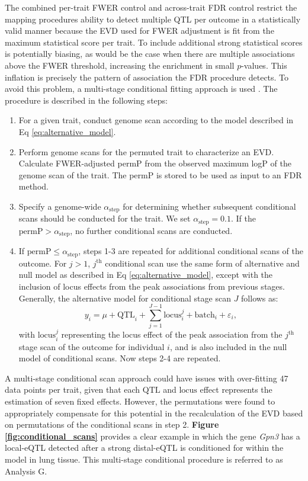 \documentclass[9pt,twocolumn,twoside]{gsajnl}
\begin{document}
The combined per-trait FWER control and across-trait FDR control restrict the mapping procedures ability to detect multiple QTL per outcome in a statistically valid manner because the EVD used for FWER adjustment is fit from the maximum statistical score per trait. To include additional strong statistical scores is potentially biasing, as would be the case when there are multiple associations above the FWER threshold, increasing the enrichment in small $p$-values. This inflation is precisely the pattern of association the FDR procedure detects. To avoid this problem, a multi-stage conditional fitting approach is used \citep{Jansen2017}. The procedure is described in the following steps:
\begin{enumerate}
	\item For a given trait, conduct genome scan according to the model described in Eq \ref{eq:alternative_model}.
    \item Perform genome scans for the permuted trait to characterize an EVD. Calculate FWER-adjusted permP from the observed maximum logP of the genome scan of the trait. The permP is stored to be used as input to an FDR method.
    \item Specify a genome-wide $\alpha_{\text{step}}$ for determining whether subsequent conditional scans should be conducted for the trait. We set $\alpha_{\text{step}} = 0.1$. If the $\text{permP} > \alpha_{\text{step}}$, no further conditional scans are conducted.
    \item If $\text{permP} \le \alpha_{\text{step}}$, steps 1-3 are repeated for additional conditional scans of the outcome. For $j > 1$, $j^{\text{th}}$ conditional scan use the same form of alternative and null model as described in Eq \ref{eq:alternative_model}, except with the inclusion of locus effects from the peak associations from previous stages. Generally, the alternative model for conditional stage scan $J$ follows as:
\begin{equation}
y_{i} = \mu + \text{QTL}_{i} + \sum_{j=1}^{J-1}\text{locus}_{i}^{j} + \text{batch}_{i} + \varepsilon_{i},
\label{eq:conditional_model}
\end{equation}
with $\text{locus}_{i}^{j}$ representing the locus effect of the peak association from the $j^{\text{th}}$ stage scan of the outcome for individual $i$, and is also included in the null model of conditional scans. Now steps 2-4 are repeated.
\end{enumerate}

A multi-stage conditional scan approach could have issues with over-fitting 47 data points per trait, given that each $\text{QTL}$ and $\text{locus}$ effect represents the estimation of seven fixed effects. However, the permutations were found to appropriately compensate for this potential in the recalculation of the EVD based on permutations of the conditional scans in step 2. \textbf{Figure \ref{fig:conditional_scans}} provides a clear example in which the gene \textit{Gpn3} has a local-eQTL detected after a strong distal-eQTL is conditioned for within the model in lung tissue. This multi-stage conditional procedure is referred to as Analysis G.
\end{document}
